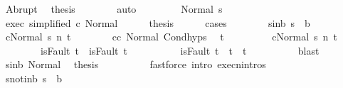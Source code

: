 \begin{isabellebody}
\ Abrupt\ \isamarkupfalse%
\ {\isacharquery}thesis\isanewline
\ \ \ \ \ \ \isamarkupfalse%
\ auto\isanewline
\ \ \isamarkupfalse%
\isanewline
\ \ \ \ \isamarkupfalse%
\ {\isacharparenleft}Normal\ s{\isacharprime}{\isacharparenright}\isanewline
\ \ \ \ \isamarkupfalse%
\ exec\ {\isacharbrackleft}simplified\ c\ Normal{\isacharbrackright}\isanewline
\ \ \ \ \isamarkupfalse%
\ {\isacharquery}thesis\isanewline
\ \ \ \ \isamarkupfalse%
\ {\isacharparenleft}cases{\isacharparenright}\isanewline
\ \ \ \ \ \ \isamarkupfalse%
\ s{\isacharprime}{\isacharunderscore}in{\isacharunderscore}b{\isacharcolon}\ {\isachardoublequoteopen}s{\isacharprime}\ {\isasymin}\ b{\isachardoublequoteclose}\ \isanewline
\ \ \ \ \ \ \isamarkupfalse%
\ {\isachardoublequoteopen}{\isasymGamma}{\isasymturnstile}{\isasymlangle}c{}{\isacharcomma}Normal\ s{\isacharprime}{\isasymrangle}\ {\isacharequal}n{\isasymRightarrow}\ t{\isachardoublequoteclose}\isanewline
\ \ \ \ \ \ \isamarkupfalse%
\ c{}{\isacharunderscore}c{}{\isacharprime}\ Normal\ Cond{\isachardot}hyps\ \isamarkupfalse%
\ t{\isacharprime}\ \isanewline
\ \ \ \ \ \ \ \ {\isachardoublequoteopen}{\isasymGamma}{\isasymturnstile}{\isasymlangle}c{}{\isacharprime}{\isacharcomma}Normal\ s{\isacharprime}{\isasymrangle}\ {\isacharequal}n{\isasymRightarrow}\ t{\isacharprime}{\isachardoublequoteclose}\ \isanewline
\ \ \ \ \ \ \ \ {\isachardoublequoteopen}isFault\ t\ {\isasymlongrightarrow}\ isFault\ t{\isacharprime}{\isachardoublequoteclose}\ \isanewline
\ \ \ \ \ \ \ \ {\isachardoublequoteopen}{\isasymnot}\ isFault\ t{\isacharprime}\ {\isasymlongrightarrow}\ t{\isacharprime}\ {\isacharequal}\ t{\isachardoublequoteclose}\isanewline
\ \ \ \ \ \ \ \ \isamarkupfalse%
\ blast\isanewline
\ \ \ \ \ \ \isamarkupfalse%
\ s{\isacharprime}{\isacharunderscore}in{\isacharunderscore}b\ Normal\ \isamarkupfalse%
\ {\isacharquery}thesis\isanewline
\ \ \ \ \ \ \ \ \isamarkupfalse%
\ {\isacharparenleft}fastforce\ intro{\isacharcolon}\ execn{\isachardot}intros{\isacharparenright}\isanewline
\ \ \ \ \isamarkupfalse%
\isanewline
\ \ \ \ \ \ \isamarkupfalse%
\ s{\isacharprime}{\isacharunderscore}notin{\isacharunderscore}b{\isacharcolon}\ {\isachardoublequoteopen}s{\isacharprime}\ {\isasymnotin}\ b{\isachardoublequoteclose}\ \isanewline

\end{isabellebody}
